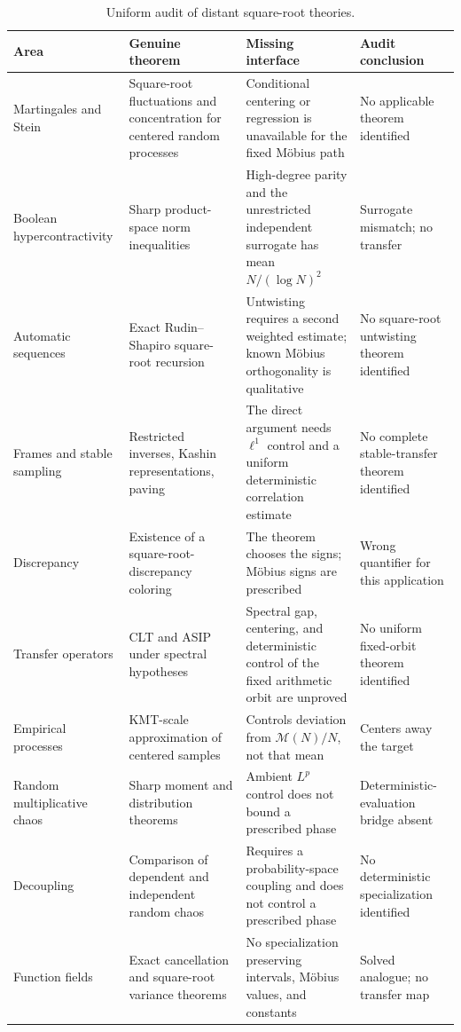\documentclass[11pt]{amsart}
\numberwithin{equation}{section}
\theoremstyle{plain}
\theoremstyle{definition}
\theoremstyle{remark}
\newcommand{\Mertens}{\mathcal M}
\begin{document}
\begin{table}[p]
\centering
\footnotesize
\caption{Uniform audit of distant square-root theories.}
\label{tab:audit}
\begin{tabularx}{\textwidth}{>{\raggedright\arraybackslash}p{}
  >{\raggedright\arraybackslash}p{}
  >{\raggedright\arraybackslash}X
  >{\raggedright\arraybackslash}p{}}
\toprule
Area & Genuine theorem & Missing interface & Audit conclusion\\
\midrule
Martingales and Stein & Square-root fluctuations and concentration for centered
random processes & Conditional centering or regression is unavailable for the
fixed M\"obius path & No applicable theorem identified\\
Boolean hypercontractivity & Sharp product-space norm inequalities & High-degree
parity and the unrestricted independent surrogate has mean
\(N/(\log N)^2\) & Surrogate mismatch; no transfer\\
Automatic sequences & Exact Rudin--Shapiro square-root recursion & Untwisting
requires a second weighted estimate; known M\"obius orthogonality is qualitative
& No square-root untwisting theorem identified\\
Frames and stable sampling & Restricted inverses, Kashin representations, paving
& The direct argument needs \(\ell^1\) control and a uniform deterministic
correlation estimate & No complete stable-transfer theorem identified\\
Discrepancy & Existence of a square-root-discrepancy coloring & The theorem chooses
the signs; M\"obius signs are prescribed & Wrong quantifier for this application\\
Transfer operators & CLT and ASIP under spectral hypotheses & Spectral gap,
centering, and deterministic control of the fixed arithmetic orbit are unproved
& No uniform fixed-orbit theorem identified\\
Empirical processes & KMT-scale approximation of centered samples & Controls
deviation from \(\Mertens(N)/N\), not that mean & Centers away the target\\
Random multiplicative chaos & Sharp moment and distribution theorems & Ambient
\(L^p\) control does not bound a prescribed phase & Deterministic-evaluation
bridge absent\\
Decoupling & Comparison of dependent and independent random chaos & Requires a
probability-space coupling and does not control a prescribed phase & No
deterministic specialization identified\\
Function fields & Exact cancellation and square-root variance theorems & No
specialization preserving intervals, M\"obius values, and constants & Solved
analogue; no transfer map\\
\bottomrule
\end{tabularx}
\end{table}
\FloatBarrier
\end{document}
